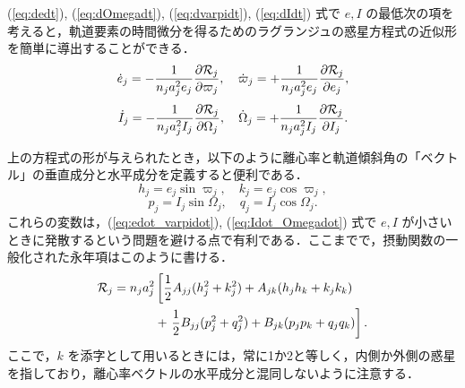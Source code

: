 \documentclass[11pt,a4paper,oneside,onecolumn]{jarticle}
\begin{document}
(\ref{eq:dedt}), (\ref{eq:dOmegadt}), (\ref{eq:dvarpidt}), (\ref{eq:dIdt}) 式で $e, I$ の最低次の項を考えると，軌道要素の時間微分を得るためのラグランジュの惑星方程式の近似形を簡単に導出することができる．
\begin{equation}
\dot{e}_j = - \frac{1}{n_j a_j^2 e_j} \frac{\partial {\cal R}_j}{\partial \varpi_j}, \quad \dot{\varpi}_j = + \frac{1}{n_j a_j^2 e_j} \frac{\partial {\cal R}_j}{\partial e_j}, \label{eq:edot_varpidot}
\end{equation}
\begin{equation}
\dot{I}_j = - \frac{1}{n_j a_j^2 I_j} \frac{\partial {\cal R}_j}{\partial \Omega_j}, \quad \dot{\Omega}_j = + \frac{1}{n_j a_j^2 I_j} \frac{\partial {\cal R}_j}{\partial I_j}. \label{eq:Idot_Omegadot}
\end{equation}

上の方程式の形が与えられたとき，以下のように離心率と軌道傾斜角の「ベクトル」の垂直成分と水平成分を定義すると便利である．
\begin{equation}
h_j = e_j \sin \varpi_j, \quad k_j = e_j \cos \varpi_j,
\end{equation}
\begin{equation}
p_j = I_j \sin \Omega_j, \quad q_j = I_j \cos \Omega_j.
\end{equation}
これらの変数は，(\ref{eq:edot_varpidot}), (\ref{eq:Idot_Omegadot}) 式で $e, I$ が小さいときに発散するという問題を避ける点で有利である．ここまでで，摂動関数の一般化された永年項はこのように書ける．
\begin{equation}
\begin{split}
{\cal R}_j = n_j a_j^2 & \left[ \frac{1}{2} A_{jj} (h_j^2 + k_j^2) + A_{jk} (h_j h_k + k_j k_k) \right. \\
& + \left. \frac{1}{2} B_{jj} (p_j^2 + q_j^2) + B_{jk} (p_j p_k + q_j q_k) \right]. \\
\end{split} \label{eq:cal_R_hkpq}
\end{equation} 
ここで，$k$ を添字として用いるときには，常に1か2と等しく，内側か外側の惑星を指しており，離心率ベクトルの水平成分と混同しないように注意する．
\end{document}
